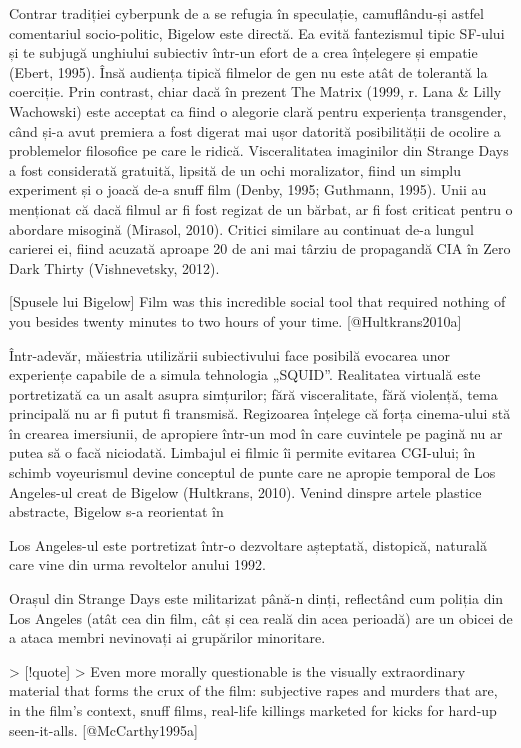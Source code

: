 \documentclass[12pt]{article}
\begin{document}
Contrar \dedouble tradiției \sqtworight cyberpunk de a se refugia în speculație, camuflându-și astfel comentariul socio-politic, Bigelow este directă. Ea evită fantezismul tipic SF-ului și te subjugă unghiului subiectiv într-un efort de a crea înțelegere și empatie (Ebert, 1995). Însă audiența tipică filmelor de gen nu este atât de tolerantă la coerciție. Prin contrast, chiar dacă în prezent The Matrix (1999, r. Lana & Lilly Wachowski) este acceptat ca fiind o alegorie clară pentru experiența transgender, când și-a avut premiera a fost digerat mai ușor datorită posibilității de ocolire a problemelor filosofice pe care le ridică. Visceralitatea imaginilor din Strange Days a fost considerată gratuită, lipsită de un ochi moralizator, fiind un simplu experiment și o joacă de-a snuff film (Denby, 1995; Guthmann, 1995). Unii au menționat că dacă filmul ar fi fost regizat de un bărbat, ar fi fost criticat pentru o abordare misogină (Mirasol, 2010). Critici similare au continuat de-a lungul carierei ei, fiind acuzată aproape 20 de ani mai târziu de propagandă CIA în Zero Dark Thirty (Vishnevetsky, 2012).\break

[Spusele lui Bigelow] Film was this incredible social tool that required nothing of you besides twenty minutes to two hours of your time. [@Hultkrans2010a]\break

Într-adevăr, măiestria utilizării subiectivului face posibilă evocarea unor experiențe capabile de a simula tehnologia „SQUID”. Realitatea virtuală este portretizată ca un asalt asupra simțurilor; fără visceralitate, fără violență, tema principală nu ar fi putut fi transmisă. Regizoarea înțelege că forța cinema-ului stă în crearea imersiunii, de apropiere într-un mod în care cuvintele pe pagină nu ar putea să o facă niciodată. Limbajul ei filmic îi permite evitarea CGI-ului; în schimb voyeurismul devine conceptul de punte care ne apropie temporal de Los Angeles-ul creat de Bigelow (Hultkrans, 2010). Venind dinspre artele plastice abstracte, Bigelow s-a reorientat în

Los Angeles-ul este portretizat într-o dezvoltare așteptată, distopică, naturală care vine din urma revoltelor anului 1992. 

Orașul din Strange Days este militarizat până-n dinți, reflectând cum poliția din Los Angeles (atât cea din film, cât și cea reală din acea perioadă) are un obicei de a ataca membri nevinovați ai grupărilor minoritare.

> [!quote]
> Even more morally questionable is the visually extraordinary material that forms the crux of the film: subjective rapes and murders that are, in the film’s context, snuff films, real-life killings marketed for kicks for hard-up seen-it-alls. [@McCarthy1995a]
\end{document}
